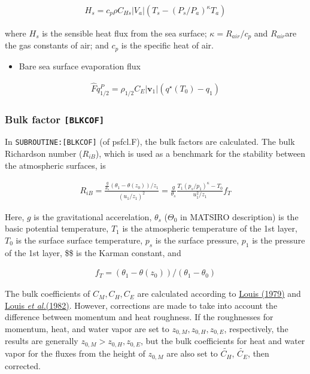 \begin{itemize}
\begin{eqnarray}
 H_s = c_p \rho C_{Hs}|V_a| (T_s - (P_s/P_a)^{\kappa}T_a)
\end{eqnarray}

where \(H_s\) is the sensible heat flux from the sea surface;
\(\kappa = R_{air} / c_p\) and \(R_{air}\)are the gas constants of air;
and \(c_p\) is the specific heat of air.

\begin{itemize}
\tightlist
\item
  Bare sea surface evaporation flux
\end{itemize}

\begin{eqnarray}
\hat{F}q^P_{1/2} = \rho_{1/2} C_E |{\mathbf{v}}_1| \left( q^\star(T_0) - q_1 \right)
\end{eqnarray}

\hypertarget{bulk-factor-blkcof}{%
\subsubsection{\texorpdfstring{Bulk factor
\texttt{{[}BLKCOF{]}}}{Bulk factor {[}BLKCOF{]}}}\label{bulk-factor-blkcof}}

In \texttt{SUBROUTINE:{[}BLKCOF{]}} (of psfcl.F), the bulk factors are
calculated. The bulk Richardson number (\(R_{iB}\)), which is used as a
benchmark for the stability between the atmospheric surfaces, is

\begin{eqnarray}
R_{iB} =
            \frac{ \frac{g}{\theta_s} (\theta_1 - \theta(z_0))/z_1 }
              { (u_1/z_1)^2                                  }
       = \frac{g}{\theta_s}
         \frac{T_1 (p_s/p_1)^\kappa - T_0 }{u_1^2/z_1} f_T
\end{eqnarray}

Here, \(g\) is the gravitational accerelation, \(\theta_s\)
(\(\Theta_0\) in MATSIRO description) is the basic potential
temperature, \(T_1\) is the atmospheric temperature of the 1st layer,
\(T_0\) is the surface surface temperature, \(p_s\) is the surface
pressure, \(p_1\) is the pressure of the 1st layer, \$\kappa \$ is the
Karman constant, and

\begin{eqnarray}
f_T = (\theta_1 - \theta(z_0))/(\theta_1 - \theta_0)
\end{eqnarray}

The bulk coefficients of \(C_M,C_H,C_E\) are calculated according to
\href{https://link.springer.com/content/pdf/10.1007/BF00117978.pdf}{Louis
(1979)} and
\href{https://www.ecmwf.int/en/elibrary/10845-short-history-pbl-parameterization-ecmwf}{Louis
{\emph{et al.}}(1982)}. However, corrections are made to take into
account the difference between momentum and heat roughness. If the
roughnesses for momentum, heat, and water vapor are set to
\(z_{0,M}, z_{0,H}, z_{0,E}\), respectively, the results are generally
\(z_{0,M} > z_{0,H}, z_{0,E}\), but the bulk coefficients for heat and
water vapor for the fluxes from the height of \(z_{0,M}\) are also set
to \(\widetilde{C_H}\), \(\widetilde{C_E}\), then corrected.


\end{itemize}
